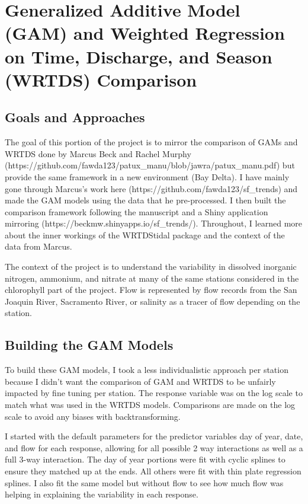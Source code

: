 \documentclass[12pt]{amsart}
\begin{document}
\section{Generalized Additive Model (GAM) and Weighted Regression on Time, Discharge, and Season (WRTDS) Comparison}

\subsection{Goals and Approaches}
The goal of this portion of the project is to mirror the comparison of GAMs and WRTDS done by Marcus Beck and Rachel Murphy (https://github.com/fawda123/patux_manu/blob/jawra/patux_manu.pdf) but provide the same framework in a new environment (Bay Delta). I have mainly gone through Marcus's work here (https://github.com/fawda123/sf_trends) and made the GAM models using the data that he pre-processed. I then built the comparison framework following the manuscript and a Shiny application mirroring (https://beckmw.shinyapps.io/sf_trends/). Throughout, I learned more about the inner workings of the WRTDStidal package and the context of the data from Marcus.

The context of the project is to understand the variability in dissolved inorganic nitrogen, ammonium, and nitrate at many of the same stations considered in the chlorophyll part of the project. Flow is represented by flow records from the San Joaquin River, Sacramento River, or salinity as a tracer of flow depending on the station.

\subsection{Building the GAM Models}

To build these GAM models, I took a less individualistic approach per station because I didn't want the comparison of GAM and WRTDS to be unfairly impacted by fine tuning per station. The response variable was on the log scale to match what was used in the WRTDS models. Comparisons are made on the log scale to avoid any biases with backtransforming.

I started with the default parameters for the predictor variables day of year, date, and flow for each response, allowing for all possible 2 way interactions as well as a full 3-way interaction. The day of year portions were fit with cyclic splines to ensure they matched up at the ends. All others were fit with thin plate regression splines. I also fit the same model but without flow to see how much flow was helping in explaining the variability in each response. 
\end{document}
